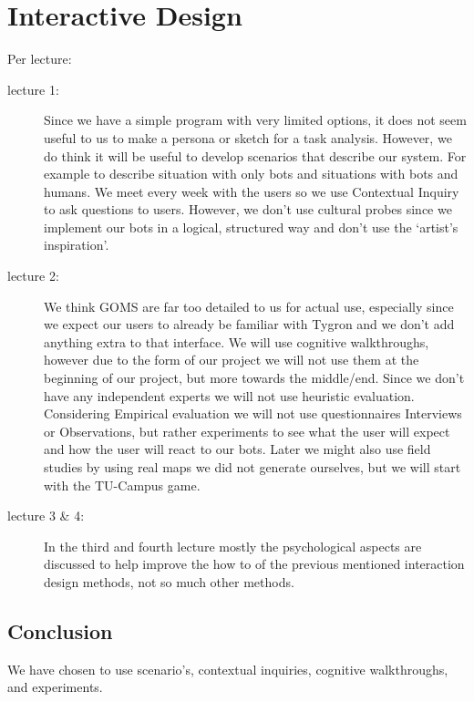 \section{Interactive Design}

Per lecture:

\begin{description}

\item[lecture 1:]
Since we have a simple program with very limited options, it does not seem useful to us to make a persona or sketch for a task analysis.
However, we do think it will be useful to develop scenarios that describe our system. For example to describe situation with only bots and situations with bots and humans.
We meet every week with the users so we use Contextual Inquiry to ask questions to users. However, we don’t use cultural probes since we implement our bots in a logical, structured way and don’t use the ‘artist’s inspiration’.

\item[lecture 2:]
We think GOMS are far too detailed to us for actual use, especially since we expect our users to already be familiar with Tygron and we don’t add anything extra to that interface. 
We will use cognitive walkthroughs, however due to the form of our project we will not use them at the beginning of our project, but more towards the middle/end. 
Since we don’t have any independent experts we will not use heuristic evaluation. 
Considering Empirical evaluation we will not use questionnaires Interviews or Observations, but rather experiments to see what the user will expect and how the user will react to our bots. Later we might also use field studies by using real maps we did not generate ourselves, but we will start with the TU-Campus game.


\item[lecture 3 \& 4:]
In the third and fourth lecture mostly the psychological aspects are discussed to help improve the how to of the previous mentioned interaction design methods, not so much other methods.

\end{description}

\subsection{Conclusion}
We have chosen to use scenario's, contextual inquiries, cognitive walkthroughs, and experiments.